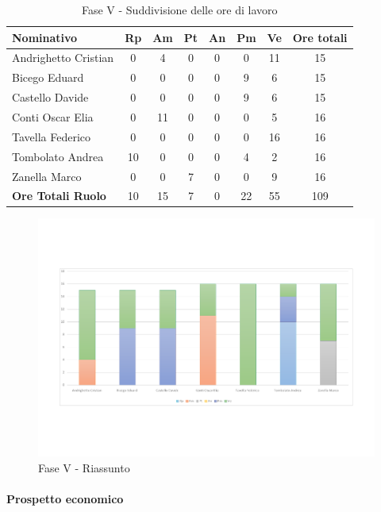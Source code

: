 \documentclass[../PianoProgetto.tex]{subfiles}
\begin{document}
	\begin{table}[H]
		\begin{tabularx}{\textwidth}{l  * {6}{C}  c}
			\toprule
			\textbf{Nominativo} & \textbf{Rp} & \textbf{Am} & \textbf{Pt} 
						& \textbf{An} & \textbf{Pm} & \textbf{Ve} & \textbf{Ore totali} \\
			\midrule
			Andrighetto Cristian  & 0 & 4 & 0 & 0 & 0 & 11 & 15 \\
			Bicego Eduard  & 0 & 0 & 0 & 0 & 9 & 6 & 15 \\
			Castello Davide  & 0 & 0 & 0 & 0 & 9 & 6 & 15 \\
			Conti Oscar Elia  & 0 & 11& 0 & 0 & 0 & 5 & 16 \\
			Tavella Federico  & 0 & 0 & 0 & 0 & 0 & 16 & 16 \\
			Tombolato Andrea  & 10 & 0 & 0 & 0 & 4 & 2 & 16 \\
			Zanella Marco & 0 & 0 & 7 & 0 & 0 & 9 & 16 \\
			\midrule
			\textbf{Ore Totali Ruolo} & 10 & 15 & 7 & 0 & 22 & 55 & 109 \\
			\bottomrule
		\end{tabularx}
		\caption{Fase V - Suddivisione delle ore di lavoro}
		\label{tab:faseV_ore}
	\end{table}
\vfill	

	
	\begin{figure}[H]
		\centering
		\includegraphics[width=\textwidth , trim=2cm 4cm 2cm 4cm]{grafici/V/V-ore-persona}
			\caption{Fase V - Riassunto}
		\label{fig:BarChart-faseV_ore}
	\end{figure}
\vfill	
\newpage
\vfill
	\paragraph{Prospetto economico}\
					
\end{document}
